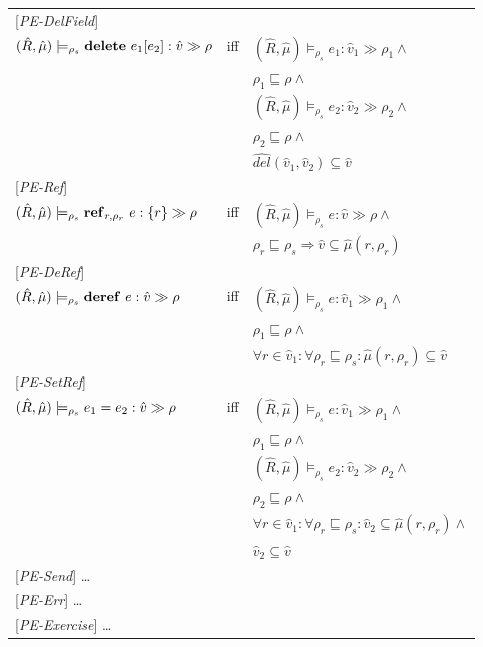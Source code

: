 \documentclass[[12pt,a4paper,twoside,openrigh]{article}
\newcommand{\vat}[0]{\hat{v}}
\newcommand{\muat}[0]{\hat{\mu}}
\newcommand{\Rat}[0]{\hat{R}}
\newcommand{\modelrho}{\models_{\rho_s}}
\newcommand{\aenvs}{(\Rat,\muat)}
\newcommand{\caesti}[2]{\aenvs \modelrho #1 : \vat_{#2} \gg \rho_{#2}}
\newcommand{\caest}[1]{\aenvs \modelrho #1 : \vat \gg \rho}
\begin{document}
\begin{tabular} {l l l}
{[\textit{PE-DelField}]}\\
$\caest {\delete {e_1} {e_2}} $& iff &$ \caesti {e_1} {1} \wedge $\\
&& $\rho_1 \sqsubseteq \rho \wedge$ \\
&& $ \caesti {e_2} {2} \wedge $ \\
&& $\rho_2 \sqsubseteq \rho \wedge$ \\
&& $\widehat{del} (\vat_1, \vat_2) \subseteq \vat$\\
{[\textit{PE-Ref}]}\\
$ \aenvs \modelrho \newref {r,\rho_r} {e} :\{r\} \gg \rho $& iff &$ \caest {e} \wedge $\\
&& $\rho_r \sqsubseteq \rho_s \Rightarrow \vat \subseteq \muat(r, \rho_r) $ \\
{[\textit{PE-DeRef}]}\\
$\caest {\deref {e}} $& iff &$ \caesti {e} {1} \wedge $\\
&& $\rho_1 \sqsubseteq \rho \wedge$ \\
&& $\forall r \in \vat_1 : \forall \rho_r \sqsubseteq \rho_s : \muat(r, \rho_r) \subseteq \vat$ \\
{[\textit{PE-SetRef}]}\\
$\caest {\setref {e_1} {e_2}} $& iff &$ \caesti {e} {1} \wedge $\\
&& $\rho_1 \sqsubseteq \rho \wedge$ \\
&& $ \caesti {e_2} {2} \wedge $ \\
&& $\rho_2 \sqsubseteq \rho \wedge$ \\
&& $\forall r \in \vat_1 : \forall \rho_r \sqsubseteq \rho_s : \vat_2 \subseteq \muat(r, \rho_r) \wedge$ \\
&& $\vat_2 \subseteq \vat $ \\
{[\textit{PE-Send}]} \dots \\
{[\textit{PE-Err}]} \dots \\
{[\textit{PE-Exercise}]} \dots \\
\end{tabular}
\end{document}
